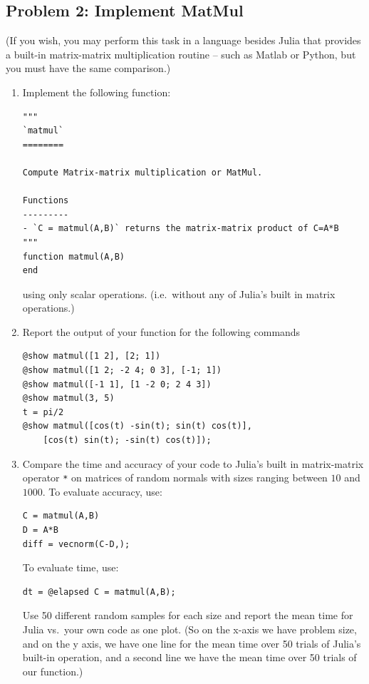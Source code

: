 \documentclass[]{article}
\begin{document}
\subsection{Problem 2: Implement
MatMul}\label{problem-2-implement-matmul}

(If you wish, you may perform this task in a language besides Julia that
provides a built-in matrix-matrix multiplication routine -- such as
Matlab or Python, but you must have the same comparison.)

\begin{enumerate}
\def\labelenumi{\arabic{enumi}.}
\item
  Implement the following function:

\begin{verbatim}
"""
`matmul`
========

Compute Matrix-matrix multiplication or MatMul.

Functions
---------
- `C = matmul(A,B)` returns the matrix-matrix product of C=A*B
"""
function matmul(A,B)        
end
\end{verbatim}

  using only scalar operations. (i.e.~without any of Julia's built in
  matrix operations.)
\item
  Report the output of your function for the following commands

\begin{verbatim}
@show matmul([1 2], [2; 1])
@show matmul([1 2; -2 4; 0 3], [-1; 1])
@show matmul([-1 1], [1 -2 0; 2 4 3])
@show matmul(3, 5)
t = pi/2
@show matmul([cos(t) -sin(t); sin(t) cos(t)], 
    [cos(t) sin(t); -sin(t) cos(t)]);
\end{verbatim}
\item
  Compare the time and accuracy of your code to Julia's built in
  matrix-matrix operator \texttt{*} on matrices of random normals with
  sizes ranging between \(10\) and \(1000\). To evaluate accuracy, use:

\begin{verbatim}
C = matmul(A,B)
D = A*B
diff = vecnorm(C-D,);
\end{verbatim}

  To evaluate time, use:

\begin{verbatim}
dt = @elapsed C = matmul(A,B);
\end{verbatim}

  Use 50 different random samples for each size and report the mean time
  for Julia vs.~your own code as one plot. (So on the x-axis we have
  problem size, and on the y axis, we have one line for the mean time
  over 50 trials of Julia's built-in operation, and a second line we
  have the mean time over 50 trials of our function.)


\end{enumerate}
\end{document}
